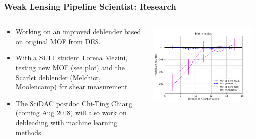 \documentclass[aspectratio=169]{beamer}
\begin{document}
\frame
{

    \frametitle{Weak Lensing Pipeline Scientist: Research}


    \begin{columns}
        \begin{column}{0.5\textwidth}

            \begin{itemize}

                \item Working on an improved deblender based on original
                    MOF from DES.

                \item With a SULI student Lorena Mezini, testing new MOF
                    (see plot) and the Scarlet deblender (Melchior, Moolencamp)
                    for shear measurement.


                  \item The SciDAC postdoc Chi-Ting Chiang (coming Aug
                    2018) will also work on deblending with machine
                    learning methods.

            \end{itemize}
        \end{column}
        \begin{column}{0.5\textwidth}
            \begin{center}
                \includegraphics[width=\textwidth]{bias-v-rad-MOF-multiband.png}
            \end{center}
        \end{column}

    \end{columns}

}
\end{document}
